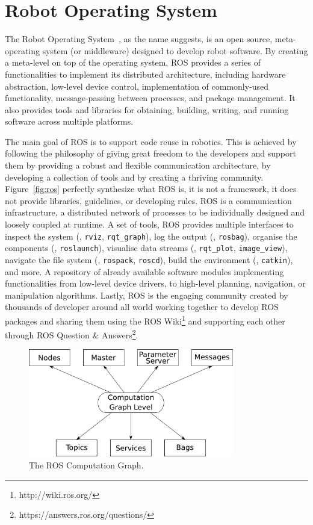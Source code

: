 \section{Robot Operating System}
\label{sec:ros}
The Robot Operating System~\cite{quigley2009ros}, as the name suggests, is an open source, meta-operating system (or middleware) designed to develop robot software. By creating a meta-level on top of the operating system, ROS provides a series of functionalities to implement its distributed architecture, including  hardware abstraction, low-level device control, implementation of commonly-used functionality, message-passing between processes, and package management. It also provides tools and libraries for obtaining, building, writing, and running software across multiple platforms.

The main goal of ROS is to support code reuse in robotics. This is achieved by following the philosophy of giving great freedom to the developers and support them by providing a robust and flexible communication architecture, by developing a collection of tools and by creating a thriving community. Figure~\ref{fig:ros} perfectly synthesize what ROS is, it is not a framework, it does not provide libraries, guidelines, or developing rules. ROS is a communication infrastructure, a distributed network of processes to be individually designed and loosely coupled at runtime. A set of tools, ROS provides multiple interfaces to inspect the system (\eg, \texttt{rviz}, \texttt{rqt\_graph}), log the output (\eg, \texttt{rosbag}), organise the components (\eg, \texttt{roslaunch}), visualise data streams (\eg, \texttt{rqt\_plot}, \texttt{image\_view}), navigate the file system (\eg, \texttt{rospack}, \texttt{roscd}), build the environment (\eg, \texttt{catkin}), and more. A repository of already available software modules implementing functionalities from low-level device drivers, to high-level planning, navigation, or manipulation algorithms. Lastly, ROS is the engaging community created by thousands of developer around all world working together to develop ROS packages and sharing them using the ROS Wiki\footnote{http://wiki.ros.org/} and supporting each other through ROS Question \& Answers\footnote{https://answers.ros.org/questions/}.

\begin{figure}[t]
    \centering
    \includegraphics[width=0.8\textwidth]{gfx/ros/graph}
    \caption{The ROS Computation Graph.}\label{fig:ros-graph}
\end{figure}

